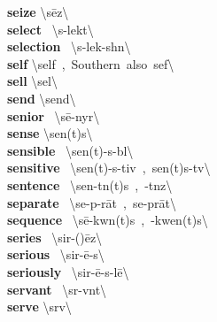 \documentclass[10pt,a4paper]{article}
\begin{document}
\begin{multicols}{2}
\textbf{ seize }\quad \textbackslash \textprimstress s\={e}z\textbackslash \\
\textbf{ select }\quad \ \textbackslash s\textschwa -\textprimstress lekt\textbackslash \\
\textbf{ selection }\quad \ \textbackslash s\textschwa -\textprimstress lek-sh\textschwa n\textbackslash \\
\textbf{ self }\quad \textbackslash \textprimstress self\ ,\ Southern\ also\ \textprimstress sef\textbackslash \\
\textbf{ sell }\quad \textbackslash \textprimstress sel\textbackslash \\
\textbf{ send }\quad \textbackslash \textprimstress send\textbackslash \\
\textbf{ senior }\quad \ \textbackslash \textprimstress s\={e}-ny\textschwa r\textbackslash \\
\textbf{ sense }\quad \textbackslash \textprimstress sen(t)s\textbackslash \\
\textbf{ sensible }\quad \ \textbackslash \textprimstress sen(t)-s\textschwa -b\textschwa l\textbackslash \\
\textbf{ sensitive }\quad \ \textbackslash \textprimstress sen(t)-s\textschwa -tiv\ ,\ \textprimstress sen(t)s-t\textschwa v\textbackslash \\
\textbf{ sentence }\quad \ \textbackslash \textprimstress sen-t\textsuperscript{\textreve}n(t)s\ ,\ -t\textsuperscript{\textreve}nz\textbackslash \\
\textbf{ separate }\quad \ \textbackslash \textprimstress se-p\textschwa -\textsecstress r\={a}t\ ,\ \textprimstress se-\textsecstress pr\={a}t\textbackslash \\
\textbf{ sequence }\quad \ \textbackslash \textprimstress s\={e}-kw\textschwa n(t)s\ ,\ -\textsecstress kwen(t)s\textbackslash \\
\textbf{ series }\quad \ \textbackslash \textprimstress sir-(\textsecstress )\={e}z\textbackslash \\
\textbf{ serious }\quad \ \textbackslash \textprimstress sir-\={e}-\textschwa s\textbackslash \\
\textbf{ seriously }\quad \ \textbackslash \textprimstress sir-\={e}-\textschwa s-l\={e}\textbackslash \\
\textbf{ servant }\quad \ \textbackslash \textprimstress s\textschwa r-v\textschwa nt\textbackslash \\
\textbf{ serve }\quad \textbackslash \textprimstress s\textschwa rv\textbackslash \\

\end{multicols}
\end{document}
